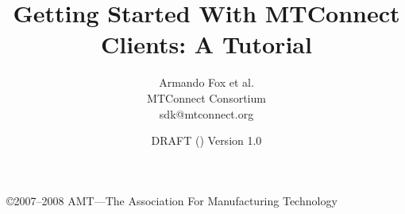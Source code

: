 \documentclass[times,11pt]{article}
\title{Getting Started With MTConnect Clients: A Tutorial}
\author{Armando Fox et al. \\ MTConnect Consortium \\ sdk@mtconnect.org}
\date{DRAFT () Version 1.0}
\begin{document}
\copyright{2007--2008 AMT---The Association For Manufacturing Technology} 


\maketitle

\tableofcontents
\newpage




% 


% 
% 
\end{document}
